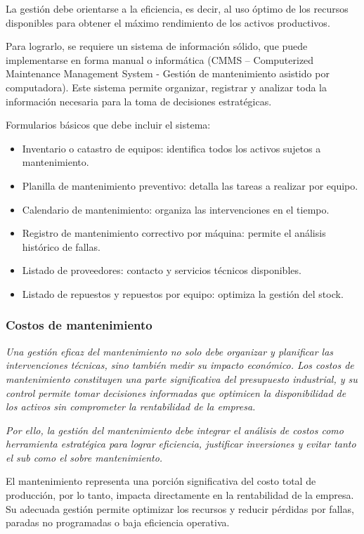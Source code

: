 \documentclass[a4paper,oneside,11pt]{article}
\begin{document}
La gestión debe orientarse a la eficiencia, es decir, al uso óptimo de los recursos disponibles para obtener el máximo rendimiento de los activos productivos.

Para lograrlo, se requiere un sistema de información sólido, que puede implementarse en forma manual o informática (CMMS – Computerized Maintenance Management System - Gestión de mantenimiento asistido por computadora). Este sistema permite organizar, registrar y analizar toda la información necesaria para la toma de decisiones estratégicas.

Formularios básicos que debe incluir el sistema:
\begin{itemize}
    \item Inventario o catastro de equipos: identifica todos los activos sujetos a mantenimiento.
    \item Planilla de mantenimiento preventivo: detalla las tareas a realizar por equipo.
    \item Calendario de mantenimiento: organiza las intervenciones en el tiempo.
    \item Registro de mantenimiento correctivo por máquina: permite el análisis histórico de fallas.
    \item Listado de proveedores: contacto y servicios técnicos disponibles.
    \item Listado de repuestos y repuestos por equipo: optimiza la gestión del stock.
\end{itemize}

\subsubsection{Costos de mantenimiento}

\textit{Una gestión eficaz del mantenimiento no solo debe organizar y planificar las intervenciones técnicas, sino también medir su impacto económico.
Los costos de mantenimiento constituyen una parte significativa del presupuesto industrial, y su control permite tomar decisiones informadas que optimicen la disponibilidad de los activos sin comprometer la rentabilidad de la empresa.}

\textit{Por ello, la gestión del mantenimiento debe integrar el análisis de costos como herramienta estratégica para lograr eficiencia, justificar inversiones y evitar tanto el sub como el sobre mantenimiento.}

El mantenimiento representa una porción significativa del costo total de producción, por lo tanto, impacta directamente en la rentabilidad de la empresa. Su adecuada gestión permite optimizar los recursos y reducir pérdidas por fallas, paradas no programadas o baja eficiencia operativa.
\end{document}
